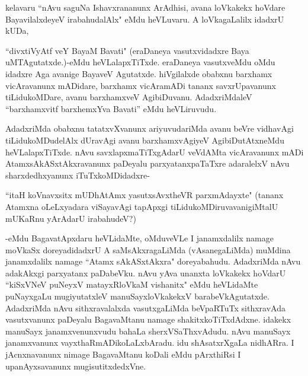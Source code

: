 kelavaru ``nAvu saguNa Ishavxrananunx ArAdhisi, avana loVkakekx hoVdare BayavilalxdeyeV irabahudalAlx" eMdu heVLuvaru. A loVkagaLalilx idadxrU kUDa,

``divxtiVyAtf veY BayaM Bavati" (eraDaneya vasutxvidadxre Baya uMTAgutatxde.)-eMdu heVLalapxTiTxde. eraDaneya vasutxveMdu oMdu idadxre Aga avanige BayaveV Agutatxde. hiVgilalxde obabxnu barxhamx vicAravanunx mADidare, barxhamx vicAramADi tananx savxrUpavanunx tiLidukoMDare, avanu barxhamxveV AgibiDuvanu. AdadxriMdaleV ``barxhamxvitf barxhemxYva Bavati'' eMdu heVLiruvudu.

AdadxriMda obabxnu tatatxvXvanunx ariyuvudariMda avanu beVre vidhavAgi tiLidukoMDudelAlx dUravAgi avanu barxhamxvAgiyeV AgibiDutAtxneMdu heVLalapxTiTxde. nAvu savxlapxmaTiTxgAdarU veVdAMta vicAravanunx mADi AtamxsAkASxtAkxravanunx paDeyalu parxyatanxpaTaTxre adaralelxV nAvu sharxdedhxyanunx iTuTxkoMDidadxre-

``itaH koVnavxsitx mUDhAtAmx yasutxsAvxtheVR parxmAdayxte" (tananx Atamxna oLeLxyadara viSayavAgi tapApxgi tiLidukoMDiruvavanigiMtalU mUKaRnu yArAdarU irabahudeV?)

-eMdu BagavatApxdaru heVLidaMte, oMduveVLe I janamxdalilx namage moVkaSx doreyadidadxrU A saMsAkxragaLiMda (vAsanegaLiMda) muMdina janamxdalilx namage ``Atamx sAkASxtAkxra" doreyabahudu. AdadxriMda nAvu adakAkxgi parxyatanx paDabeVku. nAvu yAva unanxta loVkakekx hoVdarU ``kiSxVNeV puNeyxV matayxRloVkaM vishanitx" eMdu heVLidaMte puNayxgaLu mugiyutatxleV manuSayxloVkakekxV barabeVkAgutatxde. AdadxriMda nAvu sithxravalalxda vasutxgaLiMda beVpaRTuTx sithxravAda vasutxvanunx paDeyalu BagavaMtanu namage shakitxkoTiTxdAdxne. idakekx manuSayx janamxvenunxvudu bahaLa sherxVSaThxvAdudu. nAvu manuSayx janamxvanunx vayxthaRmADikoLaLxbAradu. idu shAsatxrXgaLa nidhARra. I jAcnxnavanunx nimage BagavaMtanu koDali eMdu pArxthiRsi I upanAyxsavanunx mugisutitxdedxVne.

